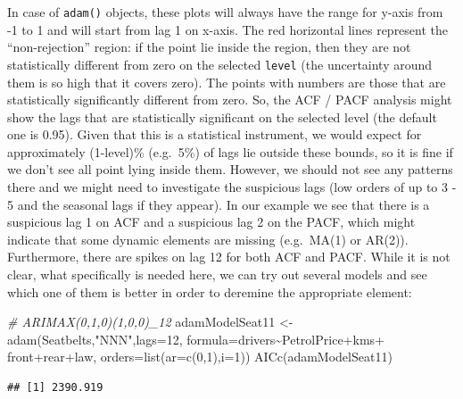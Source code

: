 \documentclass[
]{book}
\newenvironment{Shaded}{\begin{snugshade}}{\end{snugshade}}
\newcommand{\AttributeTok}[1]{\textcolor[rgb]{0.77,0.63,0.00}{#1}}
\newcommand{\CommentTok}[1]{\textcolor[rgb]{0.56,0.35,0.01}{\textit{#1}}}
\newcommand{\DecValTok}[1]{\textcolor[rgb]{0.00,0.00,0.81}{#1}}
\newcommand{\FunctionTok}[1]{\textcolor[rgb]{0.00,0.00,0.00}{#1}}
\newcommand{\NormalTok}[1]{#1}
\newcommand{\OtherTok}[1]{\textcolor[rgb]{0.56,0.35,0.01}{#1}}
\newcommand{\SpecialCharTok}[1]{\textcolor[rgb]{0.00,0.00,0.00}{#1}}
\newcommand{\StringTok}[1]{\textcolor[rgb]{0.31,0.60,0.02}{#1}}
\theoremstyle{definition}
\theoremstyle{definition}
\theoremstyle{definition}
\theoremstyle{definition}
\theoremstyle{remark}
\begin{document}
In case of \texttt{adam()} objects, these plots will always have the range for y-axis from -1 to 1 and will start from lag 1 on x-axis. The red horizontal lines represent the ``non-rejection'' region: if the point lie inside the region, then they are not statistically different from zero on the selected \texttt{level} (the uncertainty around them is so high that it covers zero). The points with numbers are those that are statistically significantly different from zero. So, the ACF / PACF analysis might show the lags that are statistically significant on the selected level (the default one is 0.95). Given that this is a statistical instrument, we would expect for approximately (1-level)\% (e.g.~5\%) of lags lie outside these bounds, so it is fine if we don't see all point lying inside them. However, we should not see any patterns there and we might need to investigate the suspicious lags (low orders of up to 3 - 5 and the seasonal lags if they appear). In our example we see that there is a suspicious lag 1 on ACF and a suspicious lag 2 on the PACF, which might indicate that some dynamic elements are missing (e.g.~MA(1) or AR(2)). Furthermore, there are spikes on lag 12 for both ACF and PACF. While it is not clear, what specifically is needed here, we can try out several models and see which one of them is better in order to deremine the appropriate element:

\begin{Shaded}
\begin{Highlighting}[]
\CommentTok{\# ARIMAX(0,1,0)(1,0,0)\_12}
\NormalTok{adamModelSeat11 }\OtherTok{\textless{}{-}} \FunctionTok{adam}\NormalTok{(Seatbelts,}\StringTok{"NNN"}\NormalTok{,}\AttributeTok{lags=}\DecValTok{12}\NormalTok{,}
                        \AttributeTok{formula=}\NormalTok{drivers}\SpecialCharTok{\textasciitilde{}}\NormalTok{PetrolPrice}\SpecialCharTok{+}\NormalTok{kms}\SpecialCharTok{+}
\NormalTok{                          front}\SpecialCharTok{+}\NormalTok{rear}\SpecialCharTok{+}\NormalTok{law,}
                        \AttributeTok{orders=}\FunctionTok{list}\NormalTok{(}\AttributeTok{ar=}\FunctionTok{c}\NormalTok{(}\DecValTok{0}\NormalTok{,}\DecValTok{1}\NormalTok{),}\AttributeTok{i=}\DecValTok{1}\NormalTok{))}
\FunctionTok{AICc}\NormalTok{(adamModelSeat11)}
\end{Highlighting}
\end{Shaded}

\begin{verbatim}
## [1] 2390.919
\end{verbatim}
\end{document}
